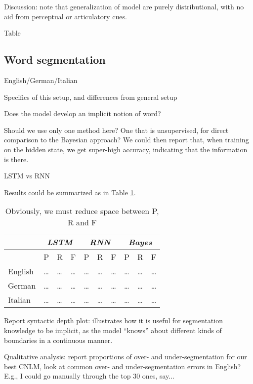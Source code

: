 Discussion: note that generalization of model are purely
distributional, with no aid from perceptual or articulatory cues.

Table



\subsection{Word segmentation}
\label{sec:segmentation}

English/German/Italian

Specifics of this setup, and differences from general setup

Does the model develop an implicit notion of word?

Should we use only one method here? One that is unsupervised, for
direct comparison to the Bayesian approach? We could then report that,
when training on the hidden state, we get super-high accuracy,
indicating that the information is there.

LSTM vs RNN

Results could be summarized as in Table \ref{tab:segmentation-results}.


\begin{table}[t]
  \begin{center}
    \begin{tabular}{l|lll|lll|lll}
      \multicolumn{1}{c}{}&\multicolumn{3}{c}{\emph{LSTM}}&\multicolumn{3}{c}{\emph{RNN}}&\multicolumn{3}{c}{\emph{Bayes}}\\
      \hline
      &P&R&F&P&R&F&P&R&F\\
      \hline
      English &\ldots & \ldots & \ldots &\ldots & \ldots & \ldots&\ldots & \ldots & \ldots\\
      German &\ldots & \ldots & \ldots &\ldots & \ldots & \ldots&\ldots & \ldots & \ldots\\
      Italian &\ldots & \ldots & \ldots &\ldots & \ldots & \ldots&\ldots & \ldots & \ldots\\
    \end{tabular}
  \end{center}
  \caption{\label{tab:segmentation-results} Obviously, we must reduce space between P, R and F}
\end{table}

Report syntactic depth plot: illustrates how it is useful for
segmentation knowledge to be implicit, as the model ``knows'' about
different kinds of boundaries in a continuous manner.

Qualitative analysis: report proportions of over- and
under-segmentation for our best CNLM, look at common over- and
under-segmentation errors in English? E.g., I could go manually
through the top 30 ones, say...

